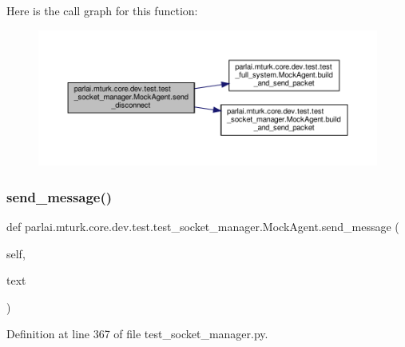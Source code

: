 Here is the call graph for this function\+:
\nopagebreak
\begin{figure}[H]
\begin{center}
\leavevmode
\includegraphics[width=350pt]{classparlai_1_1mturk_1_1core_1_1dev_1_1test_1_1test__socket__manager_1_1MockAgent_ac4626723af7b420e59f2624b45684411_cgraph}
\end{center}
\end{figure}
\mbox{\label{classparlai_1_1mturk_1_1core_1_1dev_1_1test_1_1test__socket__manager_1_1MockAgent_a0e22c9a64a4c8cefe48c673c16917ba8}} 
\subsubsection{\texorpdfstring{send\+\_\+message()}{send\_message()}}
{\footnotesize\ttfamily def parlai.\+mturk.\+core.\+dev.\+test.\+test\+\_\+socket\+\_\+manager.\+Mock\+Agent.\+send\+\_\+message (\begin{DoxyParamCaption}\item[{}]{self,  }\item[{}]{text }\end{DoxyParamCaption})}



Definition at line 367 of file test\+\_\+socket\+\_\+manager.\+py.



